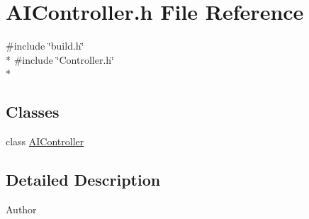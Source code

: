\section{A\-I\-Controller.\-h File Reference}
\label{_a_i_controller_8h}
{\ttfamily \#include \char`\"{}build.\-h\char`\"{}}\\*
{\ttfamily \#include \char`\"{}Controller.\-h\char`\"{}}\\*
\subsection*{Classes}
\begin{DoxyCompactItemize}
\item 
class \hyperlink{class_a_i_controller}{A\-I\-Controller}
\end{DoxyCompactItemize}


\subsection{Detailed Description}
\begin{DoxyAuthor}{Author}

\end{DoxyAuthor}

